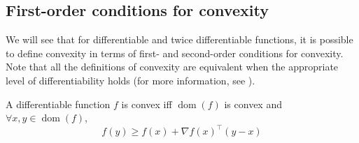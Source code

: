 \documentclass{article}
\DeclareMathOperator*{\dom}{dom}
\begin{document}
\subsection{First-order conditions for convexity}

We will see that for differentiable and twice differentiable functions, it is possible to define convexity in terms of first- and second-order conditions for convexity.
Note that all the definitions of convexity are equivalent when the appropriate level of differentiability holds (for more information, see \cite{bubeck2015convex}).

\begin{lemma}\label{lemma:first}
A differentiable function $f$ is convex iff $\dom(f)$ is convex and $\forall x, y \in \dom(f)$,
\[
	f(y) \geq f(x) + \nabla f(x)^\top(y-x)
\]
\end{lemma}
\end{document}
